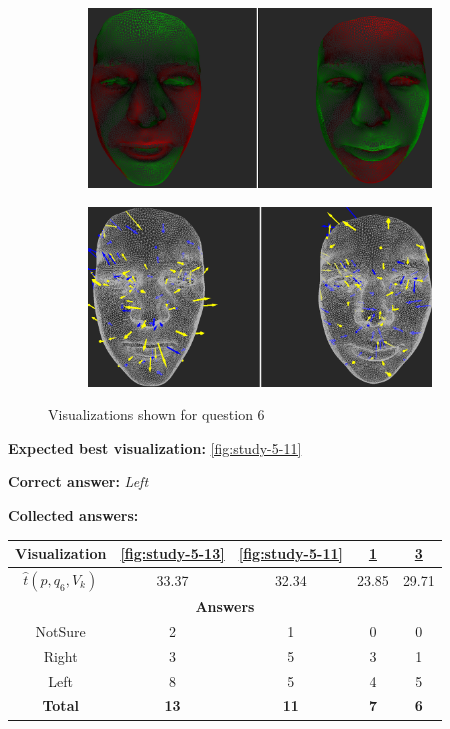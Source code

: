 \begin{figure}[h]
\begin{subfigure}{0.49\textwidth}
\includegraphics[width=\textwidth]{./img-study/pair12.PNG}
\caption{}
\label{fig:study-5-12}
\end{subfigure}
\begin{subfigure}{0.49\textwidth}
\includegraphics[width=\textwidth]{./img-study/pair14.PNG}
\caption{}
\label{fig:study-5-14}
\end{subfigure}
\caption{Visualizations shown for question 6}
\end{figure}
\medskip

{\bf Expected best visualization:} \ref{fig:study-5-11}
\medskip

{\bf Correct answer:} {\it Left}
\medskip

{\bf Collected answers:}

\begin{center}
\begin{tabular}{| c | c | c | c | c |}
	\hline
	Visualization & \ref{fig:study-5-13} & \ref{fig:study-5-11} & \ref{fig:study-5-12} & \ref{fig:study-5-14}\\ \hline
	\(\widehat{t}(p, q_6, V_k)\) & 33.37 & 32.34 & 23.85 & 29.71\\ \hline
	\multicolumn{5}{|c|}{\bf Answers} \\ \hline
	NotSure & 2 & 1 & 0 & 0\\ \hline
	Right & 3 & 5 & 3 & 1\\ \hline
	\rowcolor{yellow!30} Left & 8 & 5 & 4 & 5\\ \hline
	{\bf Total} & {\bf 13} & {\bf 11} & {\bf 7} & {\bf 6}\\ \hline
\end{tabular}
\end{center}
\clearpage

